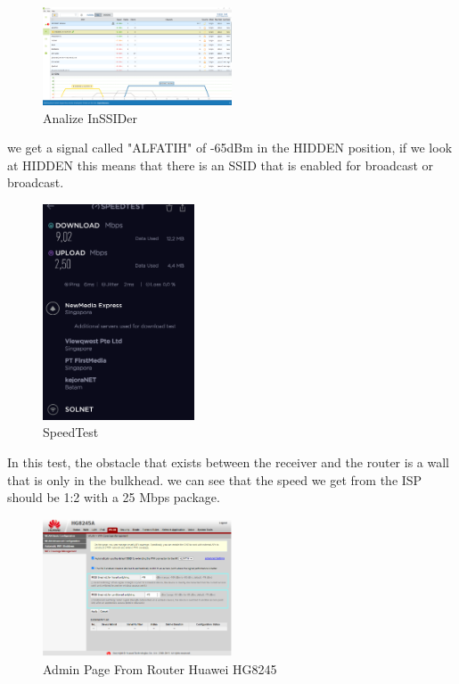 \documentclass[conference]{IEEEtran}
\begin{document}
\begin{figure}[h]
    \centering
    \includegraphics[width=0.5\textwidth]{gambar-inssider.png}
    \caption{Analize InSSIDer}
\end{figure}

we get a signal called "ALFATIH" of -65dBm in the HIDDEN position, if we look at HIDDEN this means that there is an SSID that is enabled for broadcast or broadcast.

\begin{figure}[h]
    \centering
    \includegraphics[width=0.4\textwidth]{speedtest.png}
    \caption{SpeedTest}
\end{figure}


In this test, the obstacle that exists between the receiver and the router is a wall that is only in the bulkhead. we can see that the speed we get from the ISP should be 1:2 with a 25 Mbps package.

\begin{figure}[h]
    \centering
    \includegraphics[width=0.5\textwidth]{router.png}
    \caption{Admin Page From Router Huawei HG8245}
\end{figure}
\end{document}

